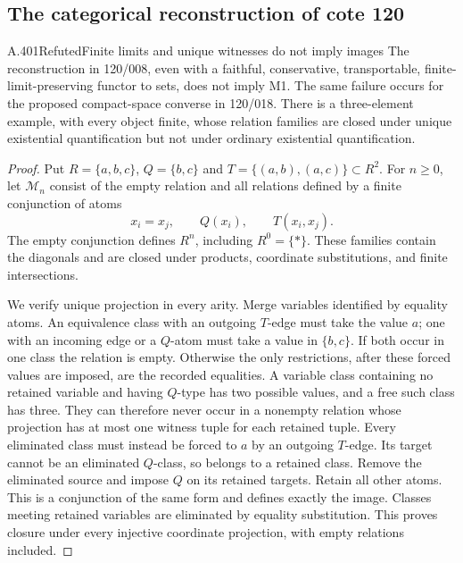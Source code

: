 \subsection{The categorical reconstruction of cote 120}

\begin{saresult}{A.401}{Refuted}{Finite limits and unique witnesses do not imply images}
The reconstruction in 120/008, even with a faithful, conservative,
transportable, finite-limit-preserving functor to sets, does not imply M1.
The same failure occurs for the proposed compact-space converse in 120/018.
There is a three-element example, with every object finite, whose relation
families are closed under unique existential quantification but not under
ordinary existential quantification.
\end{saresult}
\begin{proof}
Put $R=\{a,b,c\}$, $Q=\{b,c\}$ and
$T=\{(a,b),(a,c)\}\subset R^2$. For $n\geq0$, let
$\mathcal M_n$ consist of the empty relation and all relations defined by a
finite conjunction of atoms
\[
 x_i=x_j,\qquad Q(x_i),\qquad T(x_i,x_j).
\]
The empty conjunction defines $R^n$, including $R^0=\{*\}$.
These families contain the diagonals and are closed under products,
coordinate substitutions, and finite intersections.

We verify unique projection in every arity. Merge variables identified by
equality atoms. An equivalence class with an outgoing $T$-edge must take
the value $a$; one with an incoming edge or a $Q$-atom must take a value
in $\{b,c\}$. If both occur in one class the relation is empty. Otherwise
the only restrictions, after these forced values are imposed, are the
recorded equalities. A variable class containing no retained variable and
having $Q$-type has two possible values, and a free such class has three.
They can therefore never occur in a nonempty relation whose projection
has at most one witness tuple for each retained tuple. Every eliminated
class must instead be forced to $a$ by an outgoing $T$-edge. Its target
cannot be an eliminated $Q$-class, so belongs to a retained class. Remove
the eliminated source and impose $Q$ on its retained targets. Retain all
other atoms. This is a conjunction of the same form and defines exactly
the image. Classes meeting retained variables are eliminated by equality
substitution. This proves closure under every injective coordinate
projection, with empty relations included.


\end{proof}
